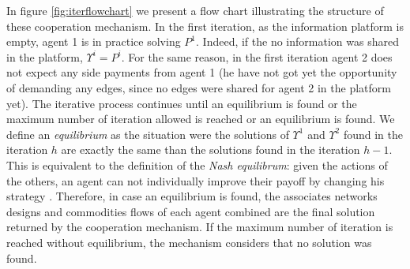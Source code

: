 \documentclass[review]{elsarticle}
\begin{document}
In figure \ref{fig:iterflowchart} we present a flow chart illustrating the structure of these cooperation mechanism.
In the first iteration, as the information platform is empty, agent 1 is in practice solving $P^1$. Indeed, if the no information was shared in the platform, $\Upsilon^i=P^i$. For the same reason, in the first iteration agent 2 does not expect any side payments from agent 1 (he have not got yet the opportunity of demanding any edges, since no edges were shared for agent 2 in the platform yet). The iterative process continues until an equilibrium is found or the maximum number of iteration allowed is reached or an equilibrium is found. We define an \emph{equilibrium} as the situation were the solutions of $\Upsilon^1$ and $\Upsilon^2$ found in the iteration $h$ are exactly the same than the solutions found in the iteration $h-1$. This is equivalent to the definition of the \emph{Nash equilibrum}: given the actions of the others, an agent can not individually improve their payoff by changing his strategy \citep{GONZALEZ2010}. Therefore, in case an equilibrium is found, the associates networks designs and commodities flows of each agent combined are the final solution returned by the cooperation mechanism. If the maximum number of iteration is reached without equilibrium, the mechanism considers that no solution was found.
\end{document}
